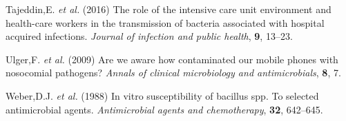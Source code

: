 \documentclass[]{article}
\begin{document}
\leavevmode\hypertarget{ref-tajeddin2016role}{}%
Tajeddin,E. \emph{et al.} (2016) The role of the intensive care unit
environment and health-care workers in the transmission of bacteria
associated with hospital acquired infections. \emph{Journal of infection
and public health}, \textbf{9}, 13--23.

\leavevmode\hypertarget{ref-ulger2009we}{}%
Ulger,F. \emph{et al.} (2009) Are we aware how contaminated our mobile
phones with nosocomial pathogens? \emph{Annals of clinical microbiology
and antimicrobials}, \textbf{8}, 7.

\leavevmode\hypertarget{ref-weber1988vitro}{}%
Weber,D.J. \emph{et al.} (1988) In vitro susceptibility of bacillus spp.
To selected antimicrobial agents. \emph{Antimicrobial agents and
chemotherapy}, \textbf{32}, 642--645.
\end{document}

